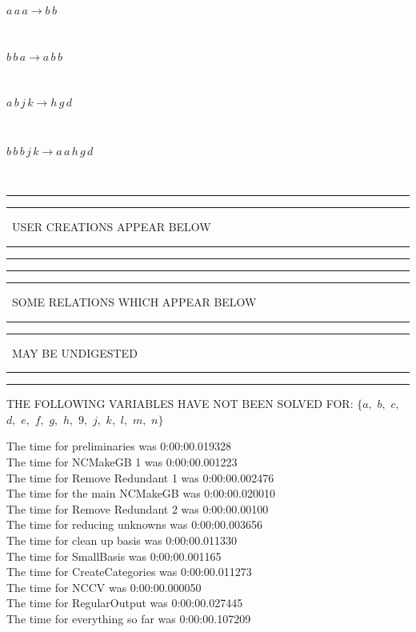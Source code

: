 \documentclass[rep10,leqno]{report}
\begin{document}
\begin{minipage}{6in}
$
a\,
 a\,
 a\rightarrow b\,
 b
$
\end{minipage}\medskip \\
\begin{minipage}{6in}
$
b\,
 b\,
 a\rightarrow a\,
 b\,
 b
$
\end{minipage}\medskip \\
\begin{minipage}{6in}
$
a\,
 b\,
 j\,
 k\rightarrow h\,
 g\,
 d
$
\end{minipage}\medskip \\
\begin{minipage}{6in}
$
b\,
 b\,
 b\,
 j\,
 k\rightarrow a\,
 a\,
 h\,
 g\,
 d
$
\end{minipage}\\
\rule[2pt]{6in}{1pt}\hfil\break
\rule[2.5pt]{1.701in}{1pt}
\ USER CREATIONS APPEAR BELOW\ 
\rule[2.5pt]{1.701in}{1pt}\hfil\break
\rule[2pt]{6in}{1pt}\hfil\break
\rule[2pt]{6in}{4pt}\hfil\break
\rule[2pt]{1.45in}{4pt}
\ SOME RELATIONS WHICH APPEAR BELOW\ 
\rule[2pt]{1.45in}{4pt}\hfil\break
\rule[2pt]{2.18in}{4pt}
\ MAY BE UNDIGESTED\ 
\rule[2pt]{2.18in}{4pt}\hfil\break
\rule[2pt]{6in}{4pt}\hfil\break
THE FOLLOWING VARIABLES HAVE NOT BEEN SOLVED FOR:\hfil\break
$\{a,
$ $
b,
$ $
c,
$ $
d,
$ $
e,
$ $
f,
$ $
g,
$ $
h,
$ $
9,
$ $
j,
$ $
k,
$ $
l,
$ $
m,
$ $
n\}$
\smallskip\\
\vspace{10pt}

\noindent
The time for preliminaries was 0:00:00.019328\\
The time for NCMakeGB 1 was 0:00:00.001223\\
The time for Remove Redundant 1 was 0:00:00.002476\\
The time for the main NCMakeGB was 0:00:00.020010\\
The time for Remove Redundant 2 was 0:00:00.00100\\
The time for reducing unknowns was 0:00:00.003656\\
The time for clean up basis was 0:00:00.011330\\
The time for SmallBasis was 0:00:00.001165\\
The time for CreateCategories was 0:00:00.011273\\
The time for NCCV was 0:00:00.000050\\
The time for RegularOutput was 0:00:00.027445\\
The time for everything so far was 0:00:00.107209\\
\end{document}
